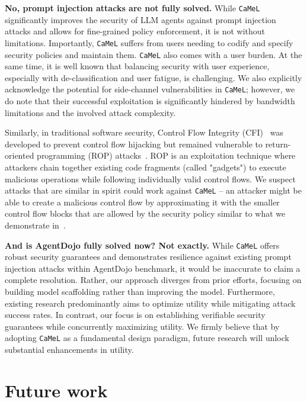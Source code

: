\documentclass[11pt, a4paper, logo, copyright]{googledeepmind}
\newcommand{\sysname}{\texttt{CaMeL}\xspace}
\begin{document}
\textbf{No, prompt injection attacks are not fully solved.} While \sysname{} significantly improves the security of LLM agents against prompt injection attacks and allows for fine-grained policy enforcement, it is not without limitations. Importantly, \sysname{} suffers from users needing to codify and specify security policies and maintain them. \sysname{} also comes with a user burden. At the same time, it is well known that balancing security with user experience, especially with de-classification and user fatigue, is challenging. We also explicitly acknowledge the potential for side-channel vulnerabilities in \sysname{}; however, we do note that their successful exploitation is significantly hindered by bandwidth limitations and the involved attack complexity.

Similarly, in traditional software security, Control Flow Integrity (CFI)~\citep{abadi2009control} was developed to prevent control flow hijacking but remained vulnerable to return-oriented programming (ROP) attacks~\citep{schacham2007rop,carlini2014rop}. ROP is an exploitation technique where attackers chain together existing code fragments (called "gadgets") to execute malicious operations while following individually valid control flows. We suspect attacks that are similar in spirit could work against \sysname{} -- an attacker might be able to create a malicious control flow by approximating it with the smaller control flow blocks that are allowed by the security policy similar to what we demonstrate in~.

\textbf{And is AgentDojo fully solved now? Not exactly.} While \sysname{} offers robust security guarantees and demonstrates resilience against existing prompt injection attacks within AgentDojo benchmark, it would be inaccurate to claim a complete resolution. Rather, our approach diverges from prior efforts, focusing on building model scaffolding rather than improving the model. Furthermore, existing research predominantly aims to optimize utility while mitigating attack success rates. In contrast, our focus is on establishing verifiable security guarantees while concurrently maximizing utility. We firmly believe that by adopting \sysname{} as a fundamental design paradigm, future research will unlock substantial enhancements in utility.

\section{Future work}
\end{document}
